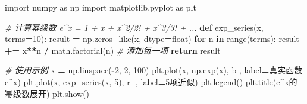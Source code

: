 \documentclass[a4paper,12pt]{article}
\newenvironment{Shaded}{\begin{snugshade}}{\end{snugshade}}
\newcommand{\KeywordTok}[1]{\textcolor[rgb]{0.13,0.29,0.53}{\textbf{#1}}}
\newcommand{\DecValTok}[1]{\textcolor[rgb]{0.00,0.00,0.81}{#1}}
\newcommand{\StringTok}[1]{\textcolor[rgb]{0.31,0.60,0.02}{#1}}
\newcommand{\ImportTok}[1]{#1}
\newcommand{\CommentTok}[1]{\textcolor[rgb]{0.56,0.35,0.01}{\textit{#1}}}
\newcommand{\ControlFlowTok}[1]{\textcolor[rgb]{0.13,0.29,0.53}{\textbf{#1}}}
\newcommand{\OperatorTok}[1]{\textcolor[rgb]{0.81,0.36,0.00}{\textbf{#1}}}
\newcommand{\BuiltInTok}[1]{#1}
\newcommand{\NormalTok}[1]{#1}
\begin{document}
\begin{Shaded}
\begin{Highlighting}[]
\ImportTok{import}\NormalTok{ numpy }\ImportTok{as}\NormalTok{ np}
\ImportTok{import}\NormalTok{ matplotlib.pyplot }\ImportTok{as}\NormalTok{ plt}

\CommentTok{\# 计算幂级数 e\^{}x = 1 + x + x\^{}2/2! + x\^{}3/3! + ...}
\KeywordTok{def}\NormalTok{ exp\_series(x, terms}\OperatorTok{=}\DecValTok{10}\NormalTok{):}
\NormalTok{    result }\OperatorTok{=}\NormalTok{ np.zeros\_like(x, dtype}\OperatorTok{=}\BuiltInTok{float}\NormalTok{)}
    \ControlFlowTok{for}\NormalTok{ n }\KeywordTok{in} \BuiltInTok{range}\NormalTok{(terms):}
\NormalTok{        result }\OperatorTok{+=}\NormalTok{ x}\OperatorTok{**}\NormalTok{n }\OperatorTok{/}\NormalTok{ math.factorial(n)  }\CommentTok{\# 添加每一项}
    \ControlFlowTok{return}\NormalTok{ result}

\CommentTok{\# 使用示例}
\NormalTok{x }\OperatorTok{=}\NormalTok{ np.linspace(}\OperatorTok{{-}}\DecValTok{2}\NormalTok{, }\DecValTok{2}\NormalTok{, }\DecValTok{100}\NormalTok{)}
\NormalTok{plt.plot(x, np.exp(x), }\StringTok{\textquotesingle{}b{-}\textquotesingle{}}\NormalTok{, label}\OperatorTok{=}\StringTok{\textquotesingle{}真实函数 e\^{}x\textquotesingle{}}\NormalTok{)}
\NormalTok{plt.plot(x, exp\_series(x, }\DecValTok{5}\NormalTok{), }\StringTok{\textquotesingle{}r{-}{-}\textquotesingle{}}\NormalTok{, label}\OperatorTok{=}\StringTok{\textquotesingle{}5项近似\textquotesingle{}}\NormalTok{)}
\NormalTok{plt.legend()}
\NormalTok{plt.title(}\StringTok{\textquotesingle{}e\^{}x的幂级数展开\textquotesingle{}}\NormalTok{)}
\NormalTok{plt.show()}
\end{Highlighting}
\end{Shaded}
\end{document}
